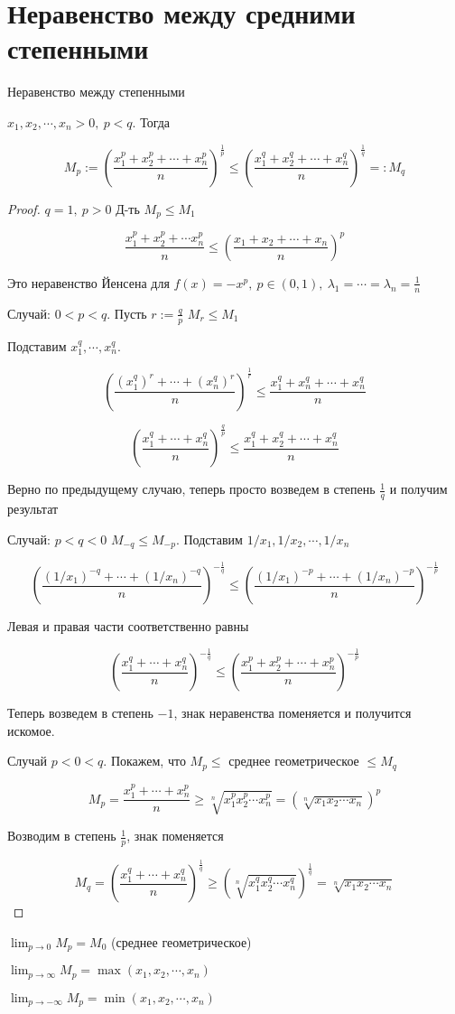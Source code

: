 \section{Неравенство между средними степенными}
\begin{theorem}
    Неравенство между степенными

    $x_1, x_2, \cdots, x_n > 0,\ p<q$. Тогда

    \[M_p:=\left(\frac{x_1^p+x_2^p+\cdots+x_n^p}{n}\right)^\frac{1}{p} \leq 
    \left(\frac{x_1^q+x_2^q+\cdots+x_n^q}{n}\right)^\frac{1}q =: M_q\]
\end{theorem}

\begin{proof}
    $q = 1,\ p>0$ Д-ть $M_p \leq M_1$

    \[\frac{x_1^p+x_2^p+\cdots x_n^p}{n} \leq \left(\frac{x_1+x_2+\cdots+x_n}{n}\right)^p\]

    Это неравенство Йенсена для $f(x) = -x^p,\ p\in (0, 1),\ \lambda_1=\cdots=\lambda_n=\frac{1}{n}$

    Случай: $0 < p < q$. Пусть $r:=\frac{q}{p}$ $M_r \leq M_1$

    Подставим $x_1^q,\cdots, x_n^q$.

    \[\left(\frac{(x_1^q)^r+\cdots+(x_n^q)^r}{n}\right  )^\frac{1}{r} \leq
    \frac{x_1^q+x_n^q+\cdots+x_n^q}{n}\]

    \[\left(\frac{x_1^q+\cdots+x_n^q}{n}\right)^\frac{q}{p} \leq
    \frac{x_1^q+x_2^q+\cdots+x_n^q}{n}\]

    Верно по предыдущему случаю, теперь просто возведем в степень $\frac{1}{q}$ и получим результат

    Случай: $p < q < 0$ $M_{-q} \leq M_{-p}$. Подставим $1/x_1, 1/x_2,\cdots, 1/x_n$

    \[ \left(\frac{(1/x_1)^{-q}+\cdots+(1/x_n)^{-q}}{n}\right)^{-\frac{1}{q}} \leq
    \left(\frac{(1/x_1)^{-p} + \cdots + (1/x_n)^{-p} }{n}\right)^{-\frac{1}{p}} \]

    Левая и правая части соответственно равны

    \[\left(\frac{x_1^q+\cdots+x_n^q}{n}\right)^{-\frac{1}{q}} \leq
    \left(\frac{x_1^p+x_2^p+\cdots+x_n^p}{n}\right)^{-\frac{1}{p}}\]

    Теперь возведем в степень $-1$, знак неравенства поменяется и получится искомое.

    Случай $p < 0 < q$. Покажем, что  $M_p \leq $ среднее геометрическое $\leq M_q$

    \[M_p = \frac{x_1^p+\cdots + x_n^p}{n} \geq \sqrt[n]{x_1^p x_2^p \cdots x_n^p} 
    = (\sqrt[n]{x_1x_2\cdots x_n})^p\]

    Возводим в степень $\frac{1}{p}$, знак поменяется

    \[M_q = \left(\frac{x_1^q+\cdots + x_n^q}{n}\right)^\frac{1}{q} \geq
    \left(\sqrt[n]{x_1^qx_2^q\cdots x_n^q}\right)^\frac{1}{q} = \sqrt[n]{x_1x_2\cdots x_n}\]


\end{proof}

\begin{theorem-non}
    $\lim_{p \to 0} M_p = M_0$ (среднее геометрическое)
    
    $\lim_{p \to \infty} M_p = \max(x_1, x_2,\cdots, x_n)$

    $\lim_{p \to -\infty} M_p = \min(x_1, x_2, \cdots, x_n)$
\end{theorem-non}